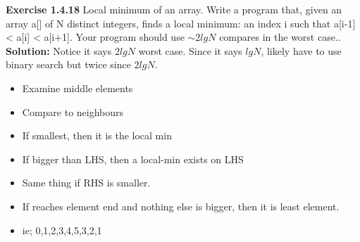 \documentclass[11pt,fleqn]{article}
\begin{document}
\textbf{Exercise 1.4.18} Local minimum of an array. Write a program that, given an array a[] of N distinct
integers, finds a local minimum: an index i such that a[i-1] < a[i] < a[i+1].
Your program should use $\sim2lg N$ compares in the worst case..\\

\textbf{Solution:} Notice it says $2lgN$ worst case. Since it says $lgN$, likely have to use binary search but twice since $2lgN$.

\begin{itemize}
	\item Examine middle elements
	\item Compare to neighbours
	\item If smallest, then it is the local min
	\item If bigger than LHS, then a local-min exists on LHS
	\item Same thing if RHS is smaller.
	\item If reaches element end and nothing else is bigger, then it is least element.
	\item ie; 0,1,2,3,4,5,3,2,1
	
	
\end{itemize}
\end{document}
